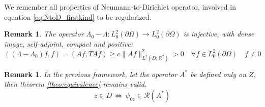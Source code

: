 \documentclass[10pt, a4paper, twoside, openright]{book}
\theoremstyle{definition}
\theoremstyle{plain}
\theoremstyle{plain}
\theoremstyle{plain}
\theoremstyle{plain}
\newtheorem{remark}[subsection]{Remark}
\theoremstyle{plain}
\theoremstyle{plain}
\theoremstyle{plain}
\theoremstyle{plain}
\begin{document}
We remember all properties of Neumann-to-Dirichlet operator, involved in equation \ref{eq:NtoD_firstkind} to be regularized.
\begin{remark}
 The operator $\Lambda_0 - \Lambda: L^2_0(\partial \Omega) \to L^2_0(\partial \Omega)$ is injective, with dense image, self-adjoint, compact and positive:
 \begin{equation}
  ((\Lambda - \Lambda_0)f,f) = ( Af,TAf) \geq c\|Af\|^2_{L^2(D;\,\mathbb{R}^2)} > 0 \quad \forall f\in L^2_0(\partial \Omega) \quad f\neq0
 \end{equation} 
\end{remark}
\begin{remark}
 In the previous framework, let the operator $A^*$ be defined only on $Z$, then theorem \ref{theo:equivalence} remains valid.
  \begin{equation}
  z \in D \,\Longleftrightarrow \,\psi_{0z} \in \mathcal{R}(A^*)
 \end{equation}
\end{remark}
\end{document}
